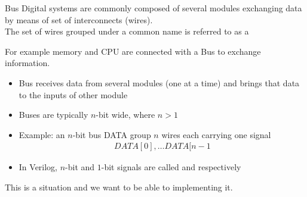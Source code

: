 \begin{parag}{Bus}
    Digital systems are commonly composed of several modules exchanging data by means of  set of interconnects (wires). \\
    The set of wires grouped under a common name is referred to as a 
    \begin{framedremark}
        For example memory and CPU are connected with a Bus to exchange information.
    \end{framedremark}
    
    \begin{itemize}
        \item Bus receives data from several modules (one at a time) and brings that data to the inputs of other module
        \item Buses are typically $n$-bit wide, where $n > 1$
        \item Example: an $n$-bit bus DATA group $n$ wires each carrying one signal
            \begin{align*}
                DATA[0], \dots DATA[n-1
            \end{align*}
        \item In Verilog, $n$-bit and $1$-bit signals are called  and  respectively
    \end{itemize}
    This is a situation and we want to be able to implementing it.
\end{parag}

